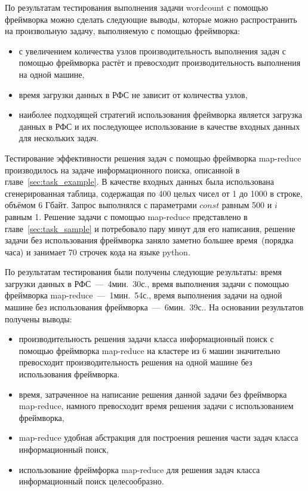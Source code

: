 \documentclass[12pt,a4paper,oneside]{extarticle}
\begin{document}
    По результатам тестирования выполнения задачи wordcount с помощью фреймворка можно сделать следующие выводы, которые можно распространить на произвольную задачу, выполняемую с помощью фреймворка:
    \begin{itemize}
        \item с увеличением количества узлов производительность выполнения задач с помощью фреймворка растёт и превосходит производительность выполнения на одной машине,
        \item время загрузки данных в РФС не зависит от количества узлов,
        \item наиболее подходящей стратегий использования фреймворка является загрузка данных в РФС и их последующее использование в качестве входных данных для нескольких задач.
    \end{itemize}
    
    Тестирование эффективности решения задач с помощью фреймворка map-reduce производилось на задаче информационного поиска, описанной в главе~\ref{sec:task_example}. В качестве входных данных была использована сгенерированная таблица, содержащая по 400 целых чисел от 1 до 1000 в строке, объёмом 6 Гбайт. Запрос выполнялся с параметрами $const$ равным 500 и $i$ равным 1. Решение задачи с помощью map-reduce представлено в главе~\ref{sec:task_sample} и потребовало пару минут для его написания, решение задачи без использования фреймворка заняло заметно большее время~(порядка часа) и занимает 70 строчек кода на языке python.

    По результатам тестирования были получены следующие результаты: время загрузки данных в РФС~---~4мин.~30с., время выполнения задачи с помощью фреймворка map-reduce~---~1мин.~54с., время выполнения задачи на одной машине без использования фреймворка~---~6мин.~39с.. На основании результатов получены выводы:
    \begin{itemize}
        \item производительность решения задачи класса информационный поиск с помощью фреймворка map-reduce на кластере из 6 машин значительно превосходит производительность решения на одной машине без использования фреймворка.
        \item время, затраченное на написание решения данной задачи без фреймворка map-reduce, намного превосходит время решения задачи с использованием фреймворка,
        \item map-reduce удобная абстракция для построения решения части задач класса информационный поиск,
        \item использование фреймфорка map-reduce для решения задач класса информационный поиск целесообразно.
    \end{itemize}
\clearpage
\end{document}
